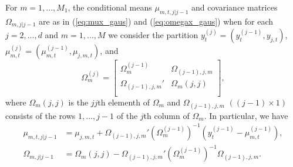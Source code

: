 \documentclass[nojss]{jss}
\begin{document}
\begin{appendix}
For $m=1,...,M_1$, the conditional means $\mu_{m,t,j|j-1}$ and covariance matrices $\Omega_{m,j|j-1}$ are as in (\ref{eq:mux_gaus}) and (\ref{eq:omegax_gaus}) when for each $j=2,...,d$ and $m=1,...,M$ we consider the partition $y_t^{(j)}=(y_t^{(j-1)},y_{j,t})$, $\mu_{m,t}^{(j)}=(\mu_{m,t}^{(j-1)},\mu_{j,m,t})$, and
\begin{equation}
\Omega_m^{(j)}=
\begin{bmatrix}
\Omega_m^{(j-1)} \quad\enspace & \Omega_{(j-1),j,m} \\
\Omega_{(j-1),j,m}' & \Omega_{m}(j,j)  \\
\end{bmatrix},
\end{equation}
where $\Omega_{m}(j,j)$ is the $jj$th elementh of $\Omega_m$ and $\Omega_{(j-1),j,m}$ $((j-1)\times 1)$  consists of the rows $1,...,j-1$ of the $j$th column of $\Omega_m$.  In particular, we have
\begin{align}
\mu_{m,t,j|j-1} &=\mu_{j,m,t} + \Omega_{(j-1),j,m}'(\Omega_m^{(j-1)})^{-1}(y_t^{(j-1)}-\mu_{m,t}^{(j-1)}),\label{eq:cond_mu_mtj_n}\\
\Omega_{m,j|j-1} &= \Omega_{m}(j,j) - \Omega_{(j-1),j,m}'(\Omega_m^{(j-1)})^{-1} \Omega_{(j-1),j,m}. \label{eq:cond_omega_mj_n}
\end{align}


\end{appendix}
\end{document}
